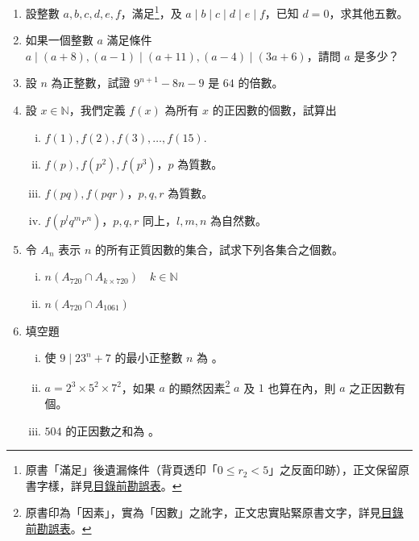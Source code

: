 \begin{enumerate}[1.]
  \item \label{item:ex6-1-8} 設整數 $a, b, c, d, e, f$，滿足\footnote{原書「滿足」後遺漏條件（背頁透印「$0 \le r_2 < 5$」之反面印跡），正文保留原書字樣，詳見\hyperref[sec:master_errata_notes]{目錄前勘誤表}。}，及 $a \mid b \mid c \mid d \mid e \mid f$，已知 $d=0$，求其他五數。

  \item 如果一個整數 $a$ 滿足條件 $a \mid (a+8), (a-1) \mid (a+11), (a-4) \mid (3a+6)$，請問 $a$ 是多少？

  \item 設 $n$ 為正整數，試證 $9^{n+1}-8n-9$ 是 $64$ 的倍數。

  \item 設 $x \in \mathbb{N}$，我們定義 $f(x)$ 為所有 $x$ 的正因數的個數，試算出
  \begin{enumerate}[(i)]
    \item $f(1), f(2), f(3), \dots, f(15)$.
    \item $f(p), f(p^2), f(p^3)$，$p$ 為質數。
    \item $f(pq), f(pqr)$，$p, q, r$ 為質數。
    \item $f(p^l q^m r^n)$，$p, q, r$ 同上，$l, m, n$ 為自然數。
  \end{enumerate}

  \item 令 $A_n$ 表示 $n$ 的所有正質因數的集合，試求下列各集合之個數。
  \begin{enumerate}[(i)]
    \item $n(A_{720} \cap A_{k \times 720}) \quad k \in \mathbb{N}$
    \item $n(A_{720} \cap A_{1061})$
  \end{enumerate}

  \item 填空題
  \begin{enumerate}[(i)]
    \item 使 $9 \mid 23^n+7$ 的最小正整數 $n$ 為 \underline{\hspace{3em}}。
    \item \label{item:ex6-1-13-2} $a=2^3 \times 5^2 \times 7^2$，如果 $a$ 的顯然因素\footnote{原書印為「因素」，實為「因數」之訛字，正文忠實貼緊原書文字，詳見\hyperref[sec:master_errata_notes]{目錄前勘誤表}。} $a$ 及 $1$ 也算在內，則 $a$ 之正因數有 \underline{\hspace{3em}} 個。
    \item $504$ 的正因數之和為 \underline{\hspace{3em}}。
  \end{enumerate}


\end{enumerate}
